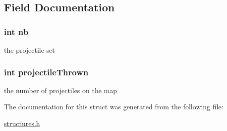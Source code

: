 \subsection{Field Documentation}
\hypertarget{structprojectile_set_ab310c6afcc676eab3930dce2650511c0}{
\subsubsection[{nb}]{\setlength{\rightskip}{0pt plus 5cm}int nb}}\label{structprojectile_set_ab310c6afcc676eab3930dce2650511c0}
the projectile set \hypertarget{structprojectile_set_accfd9d1d6194770a3368821b58ffc3b6}{
\subsubsection[{projectile\-Thrown}]{\setlength{\rightskip}{0pt plus 5cm}int projectile\-Thrown}}\label{structprojectile_set_accfd9d1d6194770a3368821b58ffc3b6}
the number of projectiles on the map 

The documentation for this struct was generated from the following file\-:\begin{DoxyCompactItemize}
\item 
\hyperlink{structures_8h}{structures.\-h}\end{DoxyCompactItemize}
